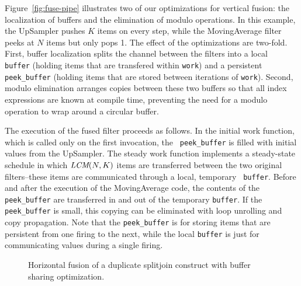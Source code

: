 Figure~\ref{fig:fuse-pipe} illustrates two of our optimizations for
vertical fusion: the localization of buffers and the elimination of
modulo operations.  In this example, the UpSampler pushes $K$ items on
every step, while the MovingAverage filter peeks at $N$ items but only
pops 1.  The effect of the optimizations are two-fold.  First, buffer
localization splits the channel between the filters into a local {\tt
buffer} (holding items that are transfered within {\tt work}) and a
persistent {\tt peek\_buffer} (holding items that are stored between
iterations of {\tt work}).  Second, modulo elimination arranges copies
between these two buffers so that all index expressions are known at
compile time, preventing the need for a modulo operation to wrap
around a circular buffer.

The execution of the fused filter proceeds as follows.  In the initial
work function, which is called only on the first invocation, the {\tt
peek\_buffer} is filled with initial values from the UpSampler.  The
steady work function implements a steady-state schedule in which
$\mbox{\it LCM}(N, K)$ items are transferred between the two original
filters--these items are communicated through a local, temporary {\tt
buffer}.  Before and after the execution of the MovingAverage code,
the contents of the {\tt peek\_buffer} are transferred in and out of
the temporary {\tt buffer}.  If the {\tt peek\_buffer} is small, this
copying can be eliminated with loop unrolling and copy propagation.
Note that the {\tt peek\_buffer} is for storing items that are
persistent from one firing to the next, while the local {\tt buffer}
is just for communicating values during a single firing.

\begin{figure}
\caption{\protect\small Horizontal fusion of a duplicate splitjoin
construct with buffer sharing optimization. \protect\label{fig:fuse-splitjoin}}
\end{figure}

